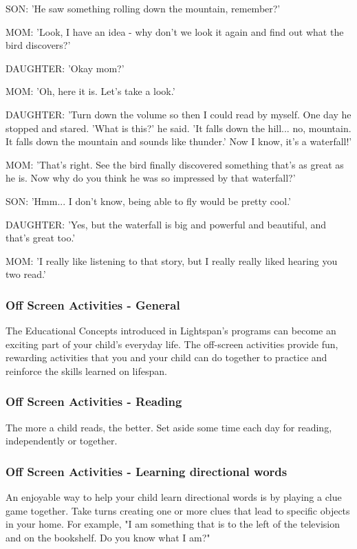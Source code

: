 SON: 'He saw something rolling down the mountain, remember?'

MOM: 'Look, I have an idea - why don't we look it again and find out what the bird discovers?'

DAUGHTER: 'Okay mom?'

MOM: 'Oh, here it is. Let's take a look.'

DAUGHTER: 'Turn down the volume so then I could read by myself. One day he stopped and stared. 'What is this?' he said. 'It falls down the hill... no, mountain. It falls down the mountain and sounds like thunder.' Now I know, it's a waterfall!'

MOM: 'That's right. See the bird finally discovered something that's as great as he is. Now why do you think he was so impressed by that waterfall?'

SON: 'Hmm... I don't know, being able to fly would be pretty cool.'

DAUGHTER: 'Yes, but the waterfall is big and powerful and beautiful, and that's great too.'

MOM: 'I really like listening to that story, but I really really liked hearing you two read.'

\subsubsection{Off Screen Activities - General}

The Educational Concepts introduced in Lightspan's programs can become an exciting part of your child's everyday life.
The off-screen activities provide fun, rewarding activities that you and your child can do together to practice and reinforce the skills learned on lifespan.

\subsubsection{Off Screen Activities - Reading}

The more a child reads, the better.
Set aside some time each day for reading, independently or together.

\subsubsection{Off Screen Activities - Learning directional words}

An enjoyable way to help your child learn directional words is by playing a clue game together.
Take turns creating one or more clues that lead to specific objects in your home.
For example, "I am something that is to the left of the television and on the bookshelf. Do you know what I am?"

